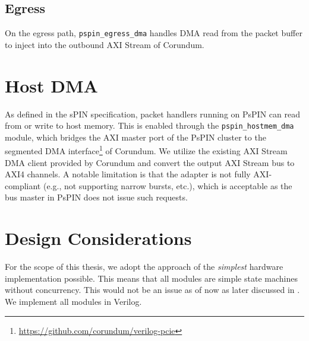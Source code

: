 \subsection{Egress}

On the egress path, \texttt{pspin\_egress\_dma} handles DMA read from the packet buffer to inject into the outbound AXI Stream of Corundum.

\section{Host DMA}

As defined in the sPIN specification, packet handlers running on PsPIN can read from or write to host memory.  This is enabled through the \texttt{pspin\_hostmem\_dma} module, which bridges the AXI master port of the PsPIN cluster to the segmented DMA interface\footnote{\url{https://github.com/corundum/verilog-pcie}} of Corundum.  We utilize the existing AXI Stream DMA client provided by Corundum and convert the output AXI Stream bus to AXI4 channels.  A notable limitation is that the adapter is not fully AXI-compliant (e.g., not supporting narrow bursts, etc.), which is acceptable as the bus master in PsPIN does not issue such requests.


\section{Design Considerations} \label{sec:hw-design-considerations}

For the scope of this thesis, we adopt the approach of the \emph{simplest} hardware implementation possible.  This means that all modules are simple state machines without concurrency. This would not be an issue as of now as later discussed in . We implement all modules in Verilog.